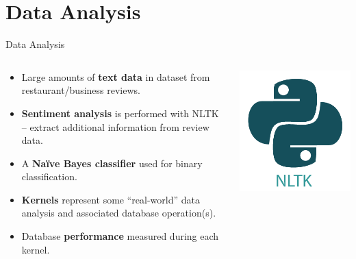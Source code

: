 \section{Data Analysis}

\begin{frame}{Data Analysis}
    \begin{columns}
        \begin{column}{.7\textwidth}
            \begin{itemize}
                \item Large amounts of \textbf{text data} in dataset from restaurant/business reviews.
                \item \textbf{Sentiment analysis} is performed with NLTK -- extract additional information from review data.
                \item A \textbf{Na\"ive Bayes classifier} used for binary classification.
                \item \textbf{Kernels} represent some ``real-world'' data analysis and associated database operation(s).
                \item Database \textbf{performance} measured during each kernel.
            \end{itemize}
            \end{column}%
            \hfill%
            \begin{column}{.29\textwidth}
            \centering
            \includegraphics[width=\columnwidth]{img/nltk-logo.png}
        \end{column}%
    \end{columns}
    \vfill
    \parnotes
\end{frame}


